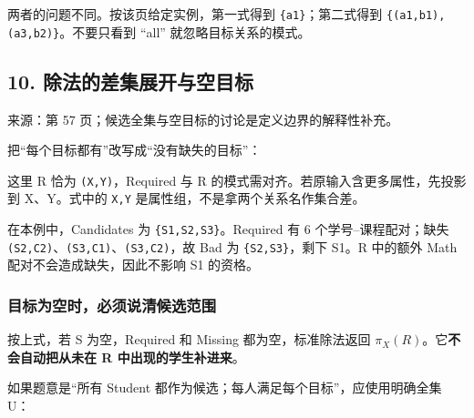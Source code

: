 两者的问题不同。按该页给定实例，第一式得到 \texttt{\{a1\}}；第二式得到 \texttt{\{(a1,b1),(a3,b2)\}}。不要只看到 ``all'' 就忽略目标关系的模式。

\subsection{10. 除法的差集展开与空目标}\label{05_relational_algebra_zh-ux9664ux6cd5ux7684ux5deeux96c6ux5c55ux5f00ux4e0eux7a7aux76eeux6807}

来源：第 57 页；候选全集与空目标的讨论是定义边界的解释性补充。

把``每个目标都有''改写成``没有缺失的目标''：


这里 R 恰为 \texttt{(\allowbreak{}X,\allowbreak{}Y)\allowbreak{}}，Required 与 R 的模式需对齐。若原输入含更多属性，先投影到 X、Y。式中的 \texttt{X,\allowbreak{}Y} 是属性组，不是拿两个关系名作集合差。

在本例中，Candidates 为 \texttt{\{S1,S2,S3\}}。Required 有 6 个学号--课程配对；缺失 \texttt{(\allowbreak{}S2,\allowbreak{}C2)\allowbreak{}}、\texttt{(\allowbreak{}S3,\allowbreak{}C1)\allowbreak{}}、\texttt{(\allowbreak{}S3,\allowbreak{}C2)\allowbreak{}}，故 Bad 为 \texttt{\{S2,S3\}}，剩下 S1。R 中的额外 Math 配对不会造成缺失，因此不影响 S1 的资格。

\subsubsection{目标为空时，必须说清候选范围}\label{05_relational_algebra_zh-ux76eeux6807ux4e3aux7a7aux65f6ux5fc5ux987bux8bf4ux6e05ux5019ux9009ux8303ux56f4}

按上式，若 S 为空，Required 和 Missing 都为空，标准除法返回 \(\pi _{X}(R)\)。它\textbf{不会自动把从未在 R 中出现的学生补进来}。

如果题意是``所有 Student 都作为候选；每人满足每个目标''，应使用明确全集 U：


